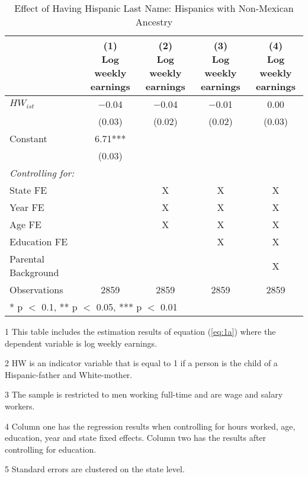 \begin{table}[H]

\caption{Effect of Having Hispanic Last Name: Hispanics with Non-Mexican Ancestry  \label{tab:lastnamereg-weekearm-nonmex}}
\centering
\begin{threeparttable}
\begin{tabular}[t]{lcccc}
\toprule
  & \specialcell{(1) \\ Log weekly \\ earnings} & \specialcell{(2) \\ Log weekly \\ earnings} & \specialcell{(3) \\  Log weekly \\ earnings} & \specialcell{(4) \\  Log weekly \\ earnings}\\
\midrule
$HW_{ist}$ & \num{-0.04} & \num{-0.04} & \num{-0.01} & \num{0.00}\\
 & (\num{0.03}) & (\num{0.02}) & (\num{0.02}) & (\num{0.03})\\
Constant & \num{6.71}*** &  &  & \\
 & (\num{0.03}) &  &  & \\
\midrule
\textit{Controlling for:} &  &  &  & \\
State FE &  & X & X & X\\
Year FE &  & X & X & X\\
Age FE &  & X & X & X\\
Education FE &  &  & X & X\\
Parental Background &  &  &  & X\\
Observations & \num{2859} & \num{2859} & \num{2859} & \num{2859}\\
\bottomrule
\multicolumn{5}{l}{\rule{0pt}{1em}* p $<$ 0.1, ** p $<$ 0.05, *** p $<$ 0.01}\\
\end{tabular}
\begin{tablenotes}
\item[1] {\footnotesize{This table includes the estimation results of equation (\ref{eq:1a}) where the dependent variable is log weekly earnings.}}
\item[2] {\footnotesize{HW is an indicator variable that is equal to 1 if a person is the child of a Hispanic-father and White-mother.}}
\item[3] {\footnotesize{The sample is restricted to men working full-time and are wage and salary workers.}}
\item[4] {\footnotesize{Column one has the regression results when controlling for hours worked, age, education, year and state fixed effects. Column two has the results after controlling for education.}}
\item[5] {\footnotesize{Standard errors are clustered on the state level.}}
\end{tablenotes}
\end{threeparttable}
\end{table}

